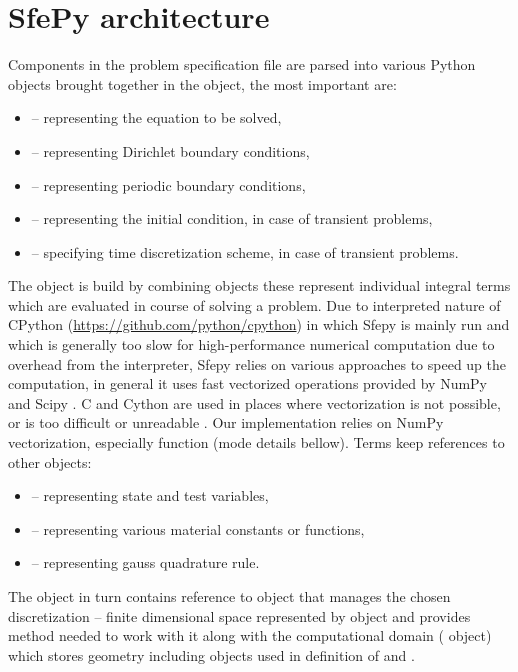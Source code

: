 \section{SfePy architecture}
Components in the problem specification file are parsed into various Python objects  
brought together in the  object, the most important are:
\begin{itemize}
    \item {} -- representing the equation to be solved,
    \item {} -- representing Dirichlet boundary conditions,
    \item {} -- representing periodic boundary conditions,
    \item {} -- representing the initial condition, in case of transient problems,
    \item {} -- specifying time discretization scheme, in case of transient problems.
\end{itemize}
The  object is build by combining  objects these 
represent individual integral terms which are evaluated in course of solving a problem.
Due to interpreted nature of CPython (\url{https://github.com/python/cpython}) in which 
Sfepy is mainly run and which is generally too slow for high-performance numerical 
computation due to overhead from the interpreter, Sfepy relies on various approaches to 
speed up the computation, in general it uses fast vectorized operations provided by NumPy 
and Scipy \cite{SciPy-NMeth2020}. C and Cython are used in places where vectorization is 
not possible, or is too difficult or unreadable \cite{Cimrman_Lukes_Rohan_2019}. 
Our implementation relies on NumPy vectorization, especially  
function (mode details bellow). Terms keep references to other objects:
\begin{itemize}
    \item {} -- representing state and test variables,
    \item {} -- representing various material constants or functions,
    \item {} -- representing gauss quadrature rule.
\end{itemize}
The  object in turn contains reference to  object that 
manages the chosen discretization -- finite dimensional space represented by 
 object and provides method needed to work with it along with the 
computational domain ( object) which stores geometry including
 objects used in definition of  and 
.










